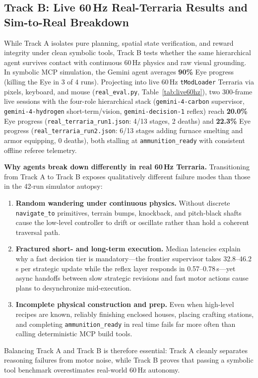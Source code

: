 \documentclass[10pt,letterpaper]{article}
\begin{document}
\subsection{Track B: Live 60\,Hz Real-Terraria Results and Sim-to-Real Breakdown}
While Track A isolates pure planning, spatial state verification, and reward integrity under clean symbolic tools, Track B tests whether the same hierarchical agent survives contact with continuous 60\,Hz physics and raw visual grounding. In symbolic MCP simulation, the Gemini agent averages \textbf{90\%} Eye progress (killing the Eye in 3 of 4 runs). Projecting into live 60\,Hz \texttt{tModLoader} Terraria via pixels, keyboard, and mouse (\texttt{real\_eval.py}, Table~\ref{tab:live60hz}), two 300-frame live sessions with the four-role hierarchical stack (\texttt{gemini-4-carbon} supervisor, \texttt{gemini-4-hydrogen} short-term/vision, \texttt{gemini-decision-1} reflex) reach \textbf{20.0\%} Eye progress (\texttt{real\_terraria\_run1.json}: 4/13 stages, 2 deaths) and \textbf{22.3\%} Eye progress (\texttt{real\_terraria\_run2.json}: 6/13 stages adding furnace smelting and armor equipping, 0 deaths), both stalling at \texttt{ammunition\_ready} with consistent offline referee telemetry.

\textbf{Why agents break down differently in real 60\,Hz Terraria.} Transitioning from Track A to Track B exposes qualitatively different failure modes than those in the 42-run simulator autopsy:
\begin{enumerate}[leftmargin=18pt,itemsep=2pt]
  \item \textbf{Random wandering under continuous physics.} Without discrete \texttt{navigate\_to} primitives, terrain bumps, knockback, and pitch-black shafts cause the low-level controller to drift or oscillate rather than hold a coherent traversal path.
  \item \textbf{Fractured short- and long-term execution.} Median latencies explain why a fast decision tier is mandatory---the frontier supervisor takes 32.8--46.2\,s per strategic update while the reflex layer responds in 0.57--0.78\,s---yet async handoffs between slow strategic revisions and fast motor actions cause plans to desynchronize mid-execution.
  \item \textbf{Incomplete physical construction and prep.} Even when high-level recipes are known, reliably finishing enclosed houses, placing crafting stations, and completing \texttt{ammunition\_ready} in real time fails far more often than calling deterministic MCP build tools.
\end{enumerate}
Balancing Track A and Track B is therefore essential: Track A cleanly separates reasoning failures from motor noise, while Track B proves that passing a symbolic tool benchmark overestimates real-world 60\,Hz autonomy.
\end{document}
